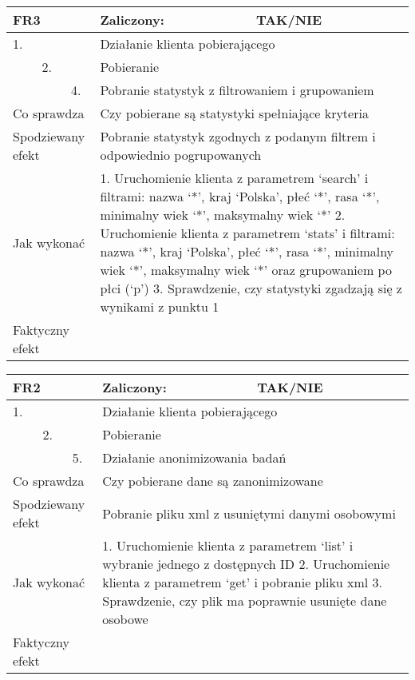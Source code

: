 \begin{tabular}{|p{20pt}|p{20pt}|p{20pt}|p{250pt}|p{60pt}|}
	\hline
	\multicolumn{3}{|p{70pt}|}{FR3} & Zaliczony: & TAK/NIE \\ \hline
	1. & & & \multicolumn{2}{|p{310pt}|}{Działanie klienta pobierającego } \\ \hline
	& 2. & & \multicolumn{2}{|p{310pt}|}{Pobieranie } \\ \hline
	& & 4. & \multicolumn{2}{|p{310pt}|}{Pobranie statystyk z filtrowaniem i grupowaniem } \\ \hline
	\multicolumn{3}{|p{70pt}|}{Co sprawdza} & \multicolumn{2}{|p{310pt}|}{Czy pobierane są statystyki spełniające kryteria} \\ \hline
	\multicolumn{3}{|p{70pt}|}{Spodziewany efekt} & \multicolumn{2}{|p{310pt}|}{Pobranie statystyk zgodnych z podanym filtrem i odpowiednio pogrupowanych} \\ \hline
	\multicolumn{3}{|p{70pt}|}{Jak wykonać} & \multicolumn{2}{|p{310pt}|}{1. Uruchomienie klienta z parametrem ‘search’ i filtrami: nazwa ‘*’, kraj ‘Polska’, płeć ‘*’, rasa ‘*’, minimalny wiek ‘*’, maksymalny wiek ‘*’
2. Uruchomienie klienta z parametrem ‘stats’ i filtrami: nazwa ‘*’, kraj ‘Polska’, płeć ‘*’, rasa ‘*’, minimalny wiek ‘*’, maksymalny wiek ‘*’ oraz grupowaniem po płci (‘p’)
3. Sprawdzenie, czy statystyki zgadzają się z wynikami z punktu 1} \\ \hline
	\multicolumn{3}{|p{70pt}|}{Faktyczny efekt} & \multicolumn{2}{|p{310pt}|}{} \\ \hline
\end{tabular}

\begin{tabular}{|p{20pt}|p{20pt}|p{20pt}|p{250pt}|p{60pt}|}
	\hline
	\multicolumn{3}{|p{70pt}|}{FR2} & Zaliczony: & TAK/NIE \\ \hline
	1. & & & \multicolumn{2}{|p{310pt}|}{Działanie klienta pobierającego } \\ \hline
	& 2. & & \multicolumn{2}{|p{310pt}|}{Pobieranie } \\ \hline
	& & 5. & \multicolumn{2}{|p{310pt}|}{Działanie anonimizowania badań } \\ \hline
	\multicolumn{3}{|p{70pt}|}{Co sprawdza} & \multicolumn{2}{|p{310pt}|}{Czy pobierane dane są zanonimizowane} \\ \hline
	\multicolumn{3}{|p{70pt}|}{Spodziewany efekt} & \multicolumn{2}{|p{310pt}|}{Pobranie pliku xml z usuniętymi danymi osobowymi} \\ \hline
	\multicolumn{3}{|p{70pt}|}{Jak wykonać} & \multicolumn{2}{|p{310pt}|}{1. Uruchomienie klienta z parametrem ‘list’ i wybranie jednego z dostępnych ID
2. Uruchomienie klienta z parametrem ‘get’ i pobranie pliku xml
3. Sprawdzenie, czy plik ma poprawnie usunięte dane osobowe} \\ \hline
	\multicolumn{3}{|p{70pt}|}{Faktyczny efekt} & \multicolumn{2}{|p{310pt}|}{} \\ \hline
\end{tabular}

